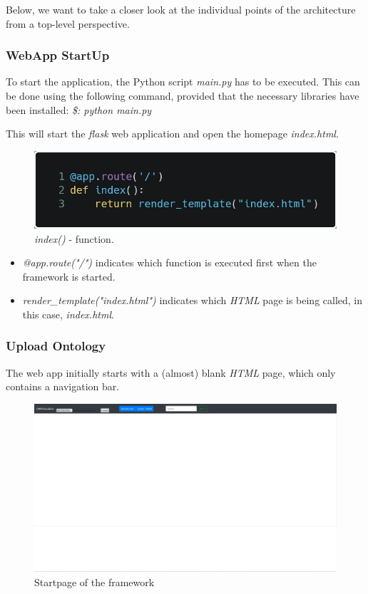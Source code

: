 Below, we want to take a closer look at the individual points of the architecture from a top-level perspective.

\subsubsection*{WebApp StartUp} 

To start the application, the Python script \textit{main.py} has to be executed. This can be done using the following command, provided that the necessary libraries have been installed:
\textit{\$: python main.py}

This will start the \textit{flask} web application and open the homepage \textit{index.html}.
\begin{figure}[!ht]
    \includegraphics[scale=0.35]{Graphics/def_index.png}
    \caption{\textit{index()} - function.}
\end{figure}

\begin{itemize}
        \item \textit{@app.route("/")} indicates which function is executed first when the framework is started.
        \item \textit{render\_template("index.html")} indicates which \textit{HTML} page is being called, in this case, \textit{index.html}.
\end{itemize}

\subsubsection*{Upload Ontology}

The web app initially starts with a (almost) blank \textit{HTML} page, which only contains a navigation bar. 
\begin{figure}[H]
    \includegraphics[scale=0.3]{Graphics/webapp_startupt_html.png}
    \caption{Startpage of the framework}
\end{figure}

